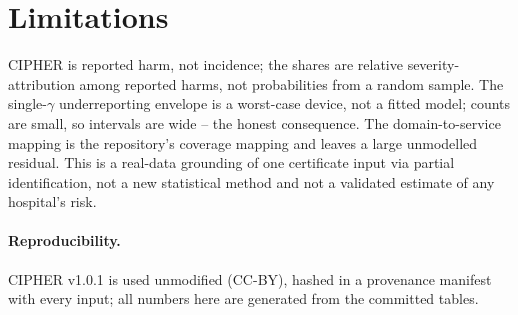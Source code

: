 \documentclass[11pt]{article}
\begin{document}
\section{Limitations}
CIPHER is reported harm, not incidence; the shares are relative
severity-attribution among reported harms, not probabilities from a random sample.
The single-$\gamma$ underreporting envelope is a worst-case device, not a fitted
model; counts are small, so intervals are wide -- the honest consequence. The
domain-to-service mapping is the repository's coverage mapping and leaves a large
unmodelled residual. This is a real-data grounding of one certificate input via
partial identification, not a new statistical method and not a validated estimate
of any hospital's risk.

\paragraph{Reproducibility.} CIPHER v1.0.1 is used unmodified (CC-BY), hashed in a
provenance manifest with every input; all numbers here are generated from the
committed tables.
\end{document}
